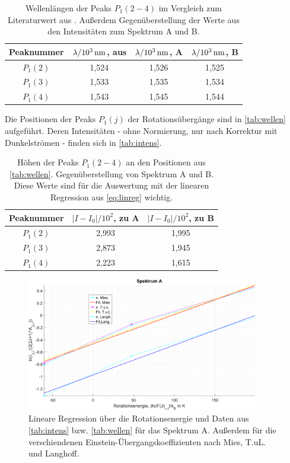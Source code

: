 \documentclass[numbers=noenddot,a4paper,notitlepage,twoside,BCOR15mm]{scrartcl}
\newcommand{\tenpo}[1]{ 10^{#1}}
\newcommand{\ix}[1]{_\text{#1}}
\begin{document}
				\begin{table}
					\centering
					\begin{tabular}{c|c|c|c}
						Peaknummer & $\lambda/\unit[\tenpo{3}]{nm}$, aus \cite{EMAUGreifswaldOHRot} & $\lambda/\unit[\tenpo{3}]{nm}$, A & $\lambda/\unit[\tenpo{3}]{nm}$, B\\
						\hline $P\ix{1}(2)$ & 1,524 & 1,526 & 1,525 \\
						\hline $P\ix{1}(3)$ & 1,533 & 1,535 & 1,534 \\
						\hline $P\ix{1}(4)$ & 1,543 & 1,545 & 1,544
					\end{tabular}
					\caption{Wellenlängen der Peaks $P\ix{1}(2-4)$ im Vergleich zum Literaturwert aus \cite{EMAUGreifswaldOHRot}. Außerdem Gegenüberstellung der Werte aus den Intensitäten zum Spektrum A und B.}
					\label{tab:wellen}
				\end{table}

			Die Positionen der Peaks $P\ix{1}(j)$ der Rotationsübergänge sind in \autoref{tab:wellen} aufgeführt. Deren Intensitäten - ohne Normierung, nur nach Korrektur mit Dunkelströmen - finden sich in \autoref{tab:intens}.

				\begin{table}
					\centering
					\begin{tabular}{c|c|c}
						Peaknummer & $|I-I\ix{0}|/\tenpo{2}$, zu A & $|I-I\ix{0}|/\tenpo{2}$, zu B\\
						\hline $P\ix{1}(2)$ & 2,993 & 1,995 \\
						\hline $P\ix{1}(3)$ & 2,873 & 1,945 \\
						\hline $P\ix{1}(4)$ & 2,223 & 1,615
					\end{tabular}
					\caption{Höhen der Peaks $P\ix{1}(2-4)$ an den Positionen aus \autoref{tab:wellen}. Gegenüberstellung von Spektrum A und B. Diese Werte sind für die Auswertung mit der linearen Regression aus \autoref{eq:linreg} wichtig.}
					\label{tab:intens}
				\end{table}

				\begin{figure}
					\centering
					\includegraphics[width=0.9\textwidth]{lin_reg_a.png}
					\caption{Lineare Regression über die Rotationsenergie und Daten aus \autoref{tab:intens} bzw. \autoref{tab:wellen} für das Spektrum A. Außerdem für die verschiendenen Einstein-Übergangskoeffizienten nach Mies, T.uL. und Langhoff.}
					\label{img:regressa}
				\end{figure}
\end{document}
